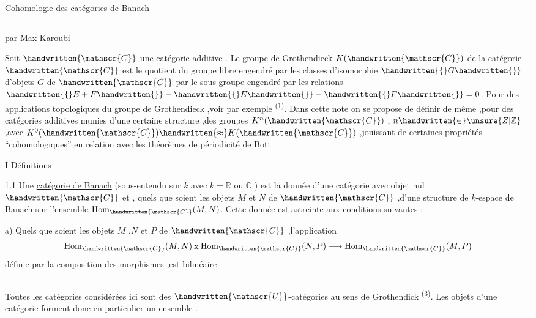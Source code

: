 \margin{\handwritten{$\uparrow$}}
\begin{center}
Cohomologie des catégories de Banach

\rule{8em}{0.4pt}

par Max Karoubi
\end{center}

Soit $\handwritten{\mathscr{C}}$ une catégorie additive \handwritten{\textsuperscript{$(*)$}}. Le \uline{groupe de Grothendieck} $K(\handwritten{\mathscr{C}})$ de la catégorie $\handwritten{\mathscr{C}}$ est le quotient du groupe libre engendré par les classes d'isomorphie $\handwritten{\{}G\handwritten{\}}$ d'objets $G$ de $\handwritten{\mathscr{C}}$ par le sous-groupe engendré par les relations $\handwritten{\{}E+F\handwritten{\}}-\handwritten{\{}E\handwritten{\}}-\handwritten{\{}F\handwritten{\}}=0$. Pour des applications topologiques du groupe de Grothendieck ,voir par exemple \textsuperscript{(1)}. Dans cette note on se propose de définir de même ,pour des catégories additives munies d'une certaine structure ,des groupes $K^n(\handwritten{\mathscr{C}})$ , $n\handwritten{\in}\unsure{Z|\mathbb{Z}}$ ,avec $K^0(\handwritten{\mathscr{C}})\handwritten{\approx}K(\handwritten{\mathscr{C}})$ ,jouissant de certaines propriétés ``cohomologiques'' en relation avec les théorèmes de périodicité de Bott .

I \qquad \uline{Définitions}

1.1 \quad Une \uline{catégorie de Banach} (sous-entendu sur $k$ avec $k=\mathbb{R}$ ou $\mathbb{C}$ ) est la donnée d'une catégorie avec objet nul $\handwritten{\mathscr{C}}$ et , quels que soient les objets $M$ et $N$ de $\handwritten{\mathscr{C}}$ ,d'une structure de $k$-espace de Banach sur l'ensemble $\operatorname{Hom}_{\handwritten{\mathscr{C}}}(M,N)$. Cette donnée est astreinte aux conditions suivantes :

a) Quels que soient les objets $M$ ,$N$ et $P$ de $\handwritten{\mathscr{C}}$ ,l'application
\[
\operatorname{Hom}_{\handwritten{\mathscr{C}}}(M,N)\mathbin{\mathrm{x}}\operatorname{Hom}_{\handwritten{\mathscr{C}}}(N,P)\longrightarrow\operatorname{Hom}_{\handwritten{\mathscr{C}}}(M,P)
\]
définie par la composition des morphismes ,est bilinéaire

\noindent\rule{\linewidth}{0.4pt}

\handwritten{\textsuperscript{$(*)$}} Toutes les catégories considérées ici sont des $\handwritten{\mathscr{U}}$-catégories au sens de Grothendick \textsuperscript{(3)}. Les objets d'une catégorie forment donc en particulier un ensemble .

